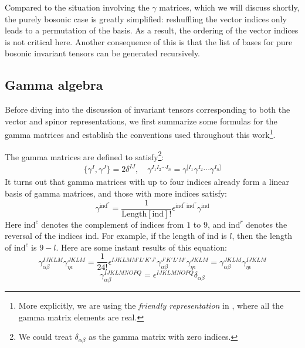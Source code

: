 \documentclass[11pt]{article}
\begin{document}
Compared to the situation involving the $\gamma$ matrices, which we will discuss shortly, the purely bosonic case is greatly simplified: reshuffling the vector indices only leads to a permutation of the basis. As a result, the ordering of the vector indices is not critical here. Another consequence of this is that the list of bases for pure bosonic invariant tensors can be generated recursively.

\subsection{Gamma algebra \label{app: GammaAlgebra}}
Before diving into the discussion of invariant tensors corresponding to both the vector and spinor representations, we first summarize some formulas for the gamma matrices and establish the conventions used throughout this work\footnote{More explicitly, we are using the \textit{friendly representation} in \cite{Freedman:2012zz}, where all the gamma matrix elements are real.}.

The gamma matrices are defined to satisfy\footnote{We could treat $\delta_{\alpha \beta}$ as the gamma matrix with zero indices.}:
\begin{align}
    \{ \gamma^I, \gamma^J \} = 2 \delta^{IJ}, \quad \gamma^{I_1 I_2 \cdots I_n} = \gamma^{[I_1} \gamma^{I_2} \cdots \gamma^{I_n]}
\end{align}
It turns out that gamma matrices with up to four indices already form a linear basis of gamma matrices, and those with more indices satisfy:
\begin{equation}\label{eq: mirror1}
    \gamma^{\text{ind}^c} = \frac{1}{\text{Length}[\text{ind}]!}\epsilon^{\text{ind}^c\,\text{ind}^r}\gamma^{\text{ind}}
\end{equation}
Here $\text{ind}^c$ denotes the complement of indices from $1$ to $9$, and $\text{ind}^r$ denotes the reversal of the indices $\text{ind}$. For example, if the length of $\text{ind}$ is $l$, then the length of $\text{ind}^c$ is $9-l$. Here are some instant results of this equation:
\begin{equation}
    \gamma _{\alpha \beta }^{IJKLM} \gamma _{\eta \epsilon }^{JKLM} = \frac{1}{24!}\epsilon^{IJKLM M'L'K'J'}\gamma _{\alpha \beta }^{J'K'L'M'}\gamma _{\eta \epsilon }^{JKLM} = \gamma _{\alpha \beta }^{JKLM} \gamma _{\eta \epsilon }^{IJKLM}
\end{equation}
\begin{equation}
    \gamma^{IJKLM NOPQ}_{\alpha\beta} = \epsilon^{IJKLM NOPQ}\delta_{\alpha\beta}
\end{equation}
\end{document}
